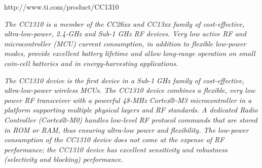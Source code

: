 \begin{framed}
	
	http://www.ti.com/product/CC1310
	
	\vspace{1em}
	\hline
	\vspace{1em}
	
	\textit{The CC1310 is a member of the CC26xx and CC13xx family of cost-effective, ultra-low-power, 2.4-GHz and Sub-1 GHz RF devices. Very low active RF and microcontroller (MCU) current consumption, in addition to flexible low-power modes, provide excellent battery lifetime and allow long-range operation on small coin-cell batteries and in energy-harvesting applications.}
		
	\textit{The CC1310 device is the first device in a Sub-1 GHz family of cost-effective, ultra-low-power wireless MCUs. The CC1310 device combines a flexible, very low power RF transceiver with a powerful 48-MHz Cortex®-M3 microcontroller in a platform supporting multiple physical layers and RF standards. A dedicated Radio Controller (Cortex®-M0) handles low-level RF protocol commands that are stored in ROM or RAM, thus ensuring ultra-low power and flexibility. The low-power consumption of the CC1310 device does not come at the expense of RF performance; the CC1310 device has excellent sensitivity and robustness (selectivity and blocking) performance.}
		
	
\end{framed}

